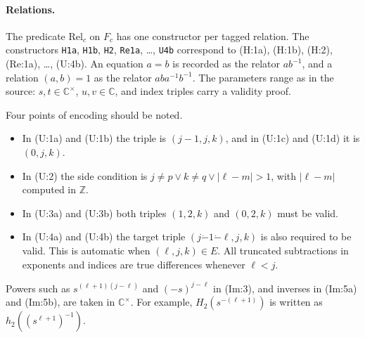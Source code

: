 \documentclass[11pt]{article}
\theoremstyle{definition}
\theoremstyle{remark}
\newcommand{\C}{\mathbb{C}}
\begin{document}
\paragraph{Relations.}
The predicate $\mathrm{Rel}_c$ on $F_c$ has one constructor per tagged relation. The constructors \texttt{H1a}, \texttt{H1b}, \texttt{H2}, \texttt{Re1a}, \dots, \texttt{U4b} correspond to (H:1a), (H:1b), (H:2), (Re:1a), \dots, (U:4b). An equation $a=b$ is recorded as the relator $ab^{-1}$, and a relation $(a,b)=1$ as the relator $aba^{-1}b^{-1}$. The parameters range as in the source: $s,t\in\C^\times$, $u,v\in\C$, and index triples carry a validity proof.

Four points of encoding should be noted.
\begin{itemize}
\item In (U:1a) and (U:1b) the triple is $(j-1,j,k)$, and in (U:1c) and (U:1d) it is $(0,j,k)$.
\item In (U:2) the side condition is $j\ne p\vee k\ne q\vee |\ell-m|>1$, with $|\ell-m|$ computed in $\mathbb Z$.
\item In (U:3a) and (U:3b) both triples $(1,2,k)$ and $(0,2,k)$ must be valid.
\item In (U:4a) and (U:4b) the target triple $(j\mathbin{\dot-}1\mathbin{\dot-}\ell,j,k)$ is also required to be valid. This is automatic when $(\ell,j,k)\in E$. All truncated subtractions in exponents and indices are true differences whenever $\ell<j$.
\end{itemize}
Powers such as $s^{(\ell+1)(j-\ell)}$ and $(-s)^{j-\ell}$ in (Im:3), and inverses in (Im:5a) and (Im:5b), are taken in $\C^\times$. For example, $H_2(s^{-(\ell+1)})$ is written as $h_2((s^{\ell+1})^{-1})$.
\end{document}
